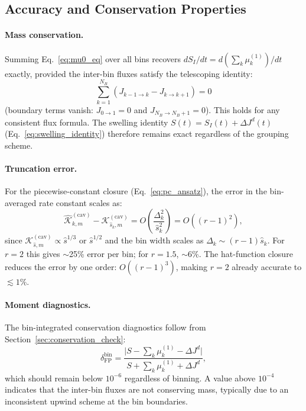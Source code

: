 \subsection{Accuracy and Conservation Properties}
\label{sec:moment_accuracy}

\paragraph{Mass conservation.}
Summing Eq.~\eqref{eq:mu0_eq} over all bins recovers
$dS_I/dt = d(\sum_k \mu_k^{(1)})/dt$ exactly, provided the inter-bin
fluxes satisfy the telescoping identity:
\begin{equation}\label{eq:flux_telescoping}
    \sum_{k=1}^{N_B}(J_{k-1\to k} - J_{k\to k+1}) = 0
\end{equation}
(boundary terms vanish: $J_{0\to 1} = 0$ and $J_{N_B\to N_B+1} = 0$).
This holds for any consistent flux formula. The swelling identity
$S(t) = S_I(t) + \Delta J^d(t)$ (Eq.~\ref{eq:swelling_identity})
therefore remains exact regardless of the grouping scheme.

\paragraph{Truncation error.}
For the piecewise-constant closure (Eq.~\ref{eq:pc_ansatz}), the
error in the bin-averaged rate constant scales as:
\begin{equation}\label{eq:truncation_error}
    \hat{\mathcal{K}}_{k,m}^{(\mathrm{cav})} - \mathcal{K}_{\hat{s}_k,m}^{(\mathrm{cav})}
    = O\!\left(\frac{\Delta_k^2}{\hat{s}_k^2}\right)
    = O\!\left((r-1)^2\right),
\end{equation}
since $\mathcal{K}_{\hat{s},m}^{(\mathrm{cav})} \propto \hat{s}^{1/3}$
or $\hat{s}^{1/2}$ and the bin width scales as $\Delta_k \sim (r-1)\hat{s}_k$.
For $r = 2$ this gives $\sim$25\% error per bin; for $r = 1.5$,
$\sim$6\%. The hat-function closure reduces the error by one order:
$O((r-1)^3)$, making $r = 2$ already accurate to $\lesssim 1\%$.

\paragraph{Moment diagnostics.}
The bin-integrated conservation diagnostics follow from
Section~\ref{sec:conservation_check}:
\begin{equation}\label{eq:delta_FP_binned}
    \delta_{\mathrm{FP}}^{\mathrm{bin}}
    = \frac{\bigl|S - \sum_k\mu_k^{(1)} - \Delta J^d\bigr|}
           {S + \sum_k\mu_k^{(1)} + \Delta J^d},
\end{equation}
which should remain below $10^{-6}$ regardless of binning. A value
above $10^{-4}$ indicates that the inter-bin fluxes are not conserving
mass, typically due to an inconsistent upwind scheme at the bin
boundaries.

